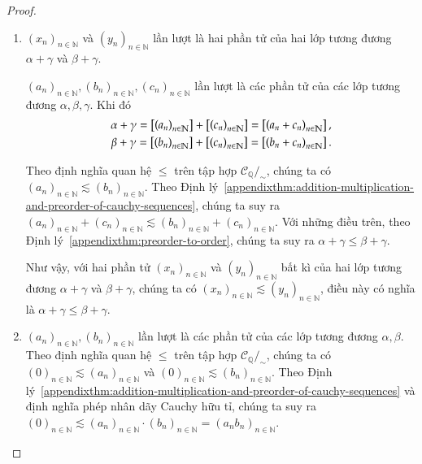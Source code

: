 \begin{proof}
    \begin{enumerate}[label={(\roman*)}]
        \item ${(x_{n})}_{n\in\mathbb{N}}$ và ${(y_{n})}_{n\in\mathbb{N}}$ lần lượt là hai phần tử của hai lớp tương đương $\alpha + \gamma$ và $\beta + \gamma$.

              ${(a_{n})}_{n\in\mathbb{N}}, {(b_{n})}_{n\in\mathbb{N}}, {(c_{n})}_{n\in\mathbb{N}}$ lần lượt là các phần tử của các lớp tương đương $\alpha, \beta, \gamma$. Khi đó
              \[
                  \begin{split}
                      \alpha + \gamma = \left[{\left({a_{n}}\right)}_{{n}\in\mathbb{N}}\right] + \left[{\left({c_{n}}\right)}_{{n}\in\mathbb{N}}\right] = \left[{\left({a_{n} + c_{n}}\right)}_{{n}\in\mathbb{N}}\right], \\
                      \beta + \gamma = \left[{\left({b_{n}}\right)}_{{n}\in\mathbb{N}}\right] + \left[{\left({c_{n}}\right)}_{{n}\in\mathbb{N}}\right] = \left[{\left({b_{n} + c_{n}}\right)}_{{n}\in\mathbb{N}}\right].
                  \end{split}
              \]

              Theo định nghĩa quan hệ $\leq$ trên tập hợp $\mathscr{C}_{\mathbb{Q}}/_{\sim}$, chúng ta có ${(a_{n})}_{n\in\mathbb{N}} \lesssim {(b_{n})}_{n\in\mathbb{N}}$. Theo Định lý~\ref{appendixthm:addition-multiplication-and-preorder-of-cauchy-sequences}, chúng ta suy ra ${(a_{n})}_{n\in\mathbb{N}} + {(c_{n})}_{n\in\mathbb{N}}\lesssim {(b_{n})}_{n\in\mathbb{N}} + {(c_{n})}_{n\in\mathbb{N}}$. Với những điều trên, theo Định lý~\ref{appendixthm:preorder-to-order}, chúng ta suy ra $\alpha + \gamma \leq \beta + \gamma$.

              Như vậy, với hai phần tử ${(x_{n})}_{n\in\mathbb{N}}$ và ${(y_{n})}_{n\in\mathbb{N}}$ bất kì của hai lớp tương đương $\alpha + \gamma$ và $\beta + \gamma$, chúng ta có ${(x_{n})}_{n\in\mathbb{N}}\lesssim {(y_{n})}_{n\in\mathbb{N}}$, điều này có nghĩa là $\alpha + \gamma \leq \beta + \gamma$.
        \item  ${(a_{n})}_{n\in\mathbb{N}}, {(b_{n})}_{n\in\mathbb{N}}$ lần lượt là các phần tử của các lớp tương đương $\alpha, \beta$. Theo định nghĩa quan hệ $\leq$ trên tập hợp $\mathscr{C}_{\mathbb{Q}}/_{\sim}$, chúng ta có ${(0)}_{n\in\mathbb{N}}\lesssim {(a_{n})}_{n\in\mathbb{N}}$ và ${(0)}_{n\in\mathbb{N}}\lesssim {(b_{n})}_{n\in\mathbb{N}}$. Theo Định lý~\ref{appendixthm:addition-multiplication-and-preorder-of-cauchy-sequences} và định nghĩa phép nhân dãy Cauchy hữu tỉ, chúng ta suy ra ${(0)}_{n\in\mathbb{N}} \lesssim {(a_{n})}_{n\in\mathbb{N}}\cdot{(b_{n})}_{n\in\mathbb{N}} = {(a_{n}b_{n})}_{n\in\mathbb{N}}$.


\end{enumerate}
\end{proof}
